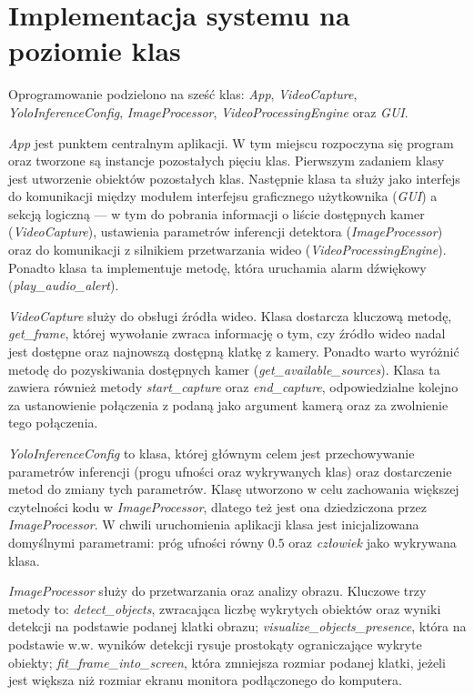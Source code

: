 \section{Implementacja systemu na poziomie klas}
Oprogramowanie podzielono na sześć klas: \emph{App}, \emph{VideoCapture}, \emph{YoloInferenceConfig}, \emph{ImageProcessor}, \emph{VideoProcessingEngine} oraz \emph{GUI}.

\emph{App} jest punktem centralnym aplikacji. W tym miejscu rozpoczyna się program oraz tworzone są instancje pozostałych pięciu klas. Pierwszym zadaniem klasy jest utworzenie obiektów pozostałych klas. Następnie klasa ta służy jako interfejs do komunikacji między modułem interfejsu graficznego użytkownika (\emph{GUI}) a sekcją logiczną — w tym do pobrania informacji o liście dostępnych kamer (\emph{VideoCapture}), ustawienia parametrów inferencji detektora (\emph{ImageProcessor}) oraz do komunikacji z silnikiem przetwarzania wideo (\emph{VideoProcessingEngine}). Ponadto klasa ta implementuje metodę, która uruchamia alarm dźwiękowy (\emph{play\_audio\_alert}).
 
\emph{VideoCapture} służy do obsługi źródła wideo. Klasa dostarcza kluczową metodę, \emph{get\_frame}, której wywołanie zwraca informację o tym, czy źródło wideo nadal jest dostępne oraz najnowszą dostępną klatkę z kamery. Ponadto warto wyróżnić metodę do pozyskiwania dostępnych kamer (\emph{get\_available\_sources}). Klasa ta zawiera również metody \emph{start\_capture} oraz \emph{end\_capture}, odpowiedzialne kolejno za ustanowienie połączenia z podaną jako argument kamerą oraz za zwolnienie tego połączenia.

\emph{YoloInferenceConfig} to klasa, której głównym celem jest przechowywanie parametrów inferencji (progu ufności oraz wykrywanych klas) oraz dostarczenie metod do zmiany tych parametrów. Klasę utworzono w celu zachowania większej czytelności kodu w \emph{ImageProcessor}, dlatego też jest ona dziedziczona przez \emph{ImageProcessor}. W chwili uruchomienia aplikacji klasa jest inicjalizowana domyślnymi parametrami: próg ufności równy $0.5$ oraz \emph{człowiek} jako wykrywana klasa.

\emph{ImageProcessor} służy do przetwarzania oraz analizy obrazu. Kluczowe trzy metody to: \emph{detect\_objects}, zwracająca liczbę wykrytych obiektów oraz wyniki detekcji na podstawie podanej klatki obrazu; \emph{visualize\_objects\_presence}, która na podstawie w.w. wyników detekcji rysuje prostokąty ograniczające wykryte obiekty; \emph{fit\_frame\_into\_screen}, która zmniejsza rozmiar podanej klatki, jeżeli jest większa niż rozmiar ekranu monitora podłączonego do komputera.

